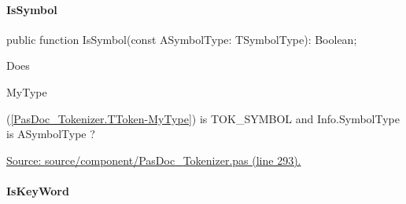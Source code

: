 \documentclass{report}
\newif\ifpdf
\begin{document}
\paragraph*{IsSymbol}\hspace*{\fill}

\label{PasDoc_Tokenizer.TToken-IsSymbol}
\begin{list}{}{
\setlength{\itemindent}{0cm}
\setlength{\listparindent}{0cm}
\setlength{\leftmargin}{\evensidemargin}
\addtolength{\leftmargin}{\tmplength}
\settowidth{\labelsep}{X}
\addtolength{\leftmargin}{\labelsep}
\setlength{\labelwidth}{\tmplength}
}
\item[\textbf{Declaration}\hfill]
\ifpdf
\begin{flushleft}
\fi
\begin{ttfamily}
public function IsSymbol(const ASymbolType: TSymbolType): Boolean;\end{ttfamily}

\ifpdf
\end{flushleft}
\fi

\par
\item[\textbf{Description}]
Does \begin{ttfamily}MyType\end{ttfamily}(\ref{PasDoc_Tokenizer.TToken-MyType}) is TOK{\_}SYMBOL and Info.SymbolType is ASymbolType ?\par
\href{https://github.com/pasdoc/pasdoc/blob/master/source/component/PasDoc_Tokenizer.pas#L293}{Source: source/component/PasDoc{\_}Tokenizer.pas (line 293).}

\end{list}
\paragraph*{IsKeyWord}\hspace*{\fill}
\end{document}
